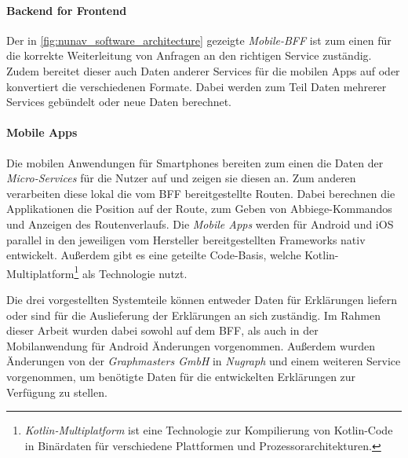 \paragraph{Backend for Frontend} Der in \autoref{fig:nunav_software_architecture} gezeigte \textit{Mobile-BFF} ist zum einen für die korrekte Weiterleitung von Anfragen an den richtigen Service zuständig. Zudem bereitet dieser auch Daten anderer Services für die mobilen Apps auf oder konvertiert die verschiedenen Formate. Dabei werden zum Teil Daten mehrerer Services gebündelt oder neue Daten berechnet. 

\paragraph{Mobile Apps} Die mobilen Anwendungen für Smartphones bereiten zum einen die Daten der \textit{Micro-Services} für die Nutzer auf und zeigen sie diesen an. Zum anderen verarbeiten diese lokal die vom BFF bereitgestellte Routen. Dabei berechnen die Applikationen die Position auf der Route, zum Geben von Abbiege-Kommandos und Anzeigen des Routenverlaufs. Die \textit{Mobile Apps} werden für Android und iOS parallel in den jeweiligen vom Hersteller bereitgestellten Frameworks nativ entwickelt. Außerdem gibt es eine geteilte Code-Basis, welche Kotlin-Multiplatform\footnote{\textit{Kotlin-Multiplatform} ist eine Technologie zur Kompilierung von Kotlin-Code in Binärdaten für verschiedene Plattformen und Prozessorarchitekturen.} als Technologie nutzt.

\bigskip

Die drei vorgestellten Systemteile können entweder Daten für Erklärungen liefern oder sind für die Auslieferung der Erklärungen an sich zuständig. Im Rahmen dieser Arbeit wurden dabei sowohl auf dem BFF, als auch in der Mobilanwendung für Android Änderungen vorgenommen. Außerdem wurden Änderungen von der \textit{Graphmasters GmbH} in \textit{Nugraph} und einem weiteren Service vorgenommen, um benötigte Daten für die entwickelten Erklärungen zur Verfügung zu stellen.